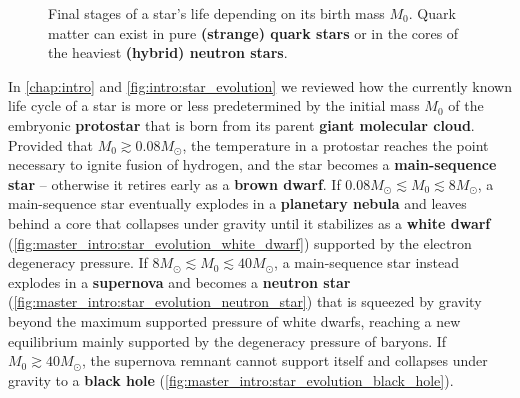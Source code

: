 \begin{figure}[b]
\caption{\label{fig:master_intro:star_evolution_end}%
	Final stages of a star's life depending on its birth mass $M_0$.
	Quark matter can exist in pure \textbf{(strange) quark stars}
	or in the cores of the heaviest \textbf{(hybrid) neutron stars}.
}
\end{figure}

In \cref{chap:intro} and \cref{fig:intro:star_evolution} we reviewed how the currently known life cycle of a star
is more or less predetermined by the initial mass $M_0$ of the embryonic \textbf{protostar} that is born from its parent \textbf{giant molecular cloud}.
Provided that $M_0 \gtrsim 0.08 M_\odot$, the temperature in a protostar reaches the point necessary to ignite fusion of hydrogen, and the star becomes a \textbf{main-sequence star} -- otherwise it retires early as a \textbf{brown dwarf}.
If $0.08 M_\odot \lesssim M_0 \lesssim 8 M_\odot$, a main-sequence star eventually explodes in a \textbf{planetary nebula} and leaves behind a core that collapses under gravity until it stabilizes as a \textbf{white dwarf} (\cref{fig:master_intro:star_evolution_white_dwarf}) supported by the electron degeneracy pressure.
If $8 M_\odot \lesssim M_0 \lesssim 40 M_\odot$, a main-sequence star instead explodes in a \textbf{supernova} and becomes a \textbf{neutron star} (\cref{fig:master_intro:star_evolution_neutron_star}) that is squeezed by gravity beyond the maximum supported pressure of white dwarfs, reaching a new equilibrium mainly supported by the degeneracy pressure of baryons.
If $M_0 \gtrsim 40 M_\odot$, the supernova remnant cannot support itself and collapses under gravity to a \textbf{black hole} (\cref{fig:master_intro:star_evolution_black_hole}).

